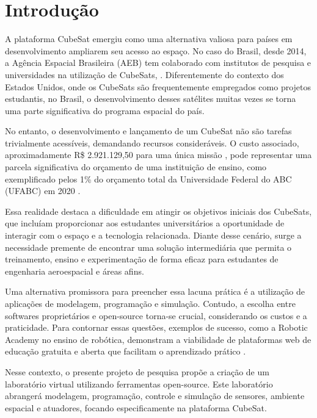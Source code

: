 
\chapter*[Introdução]{Introdução}

A plataforma CubeSat emergiu como uma alternativa valiosa para países em desenvolvimento ampliarem seu acesso ao espaço. No caso do Brasil, desde 2014, a Agência Espacial Brasileira (AEB) tem colaborado com institutos de pesquisa e universidades na utilização de CubeSats, \cite{Santos2018}. Diferentemente do contexto dos Estados Unidos, onde os CubeSats são frequentemente empregados como projetos estudantis, no Brasil, o desenvolvimento desses satélites muitas vezes se torna uma parte significativa do programa espacial do país.

No entanto, o desenvolvimento e lançamento de um CubeSat não são tarefas trivialmente acessíveis, demandando recursos consideráveis. O custo associado, aproximadamente R\$ 2.921.129,50 para uma única missão \cite{CGEE2018}, pode representar uma parcela significativa do orçamento de uma instituição de ensino, como exemplificado pelos 1\% do orçamento total da Universidade Federal do ABC (UFABC) em 2020 \cite{wikipedia2023}.

Essa realidade destaca a dificuldade em atingir os objetivos iniciais dos CubeSats, que incluíam proporcionar aos estudantes universitários a oportunidade de interagir com o espaço e a tecnologia relacionada. Diante desse cenário, surge a necessidade premente de encontrar uma solução intermediária que permita o treinamento, ensino e experimentação de forma eficaz para estudantes de engenharia aeroespacial e áreas afins.

Uma alternativa promissora para preencher essa lacuna prática é a utilização de aplicações de modelagem, programação e simulação. Contudo, a escolha entre softwares proprietários e open-source torna-se crucial, considerando os custos e a praticidade. Para contornar essas questões, exemplos de sucesso, como a Robotic Academy no ensino de robótica, demonstram a viabilidade de plataformas web de educação gratuita e aberta que facilitam o aprendizado prático \cite{canas2020ros}.

Nesse contexto, o presente projeto de pesquisa propõe a criação de um laboratório virtual utilizando ferramentas open-source. Este laboratório abrangerá modelagem, programação, controle e simulação de sensores, ambiente espacial e atuadores, focando especificamente na plataforma CubeSat.

